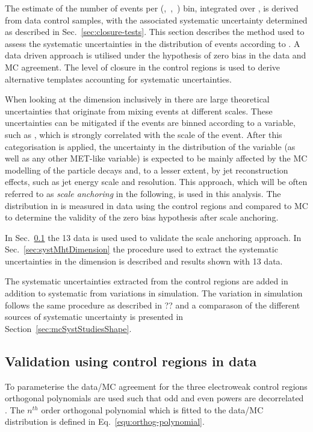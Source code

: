 The estimate of the number of events per (\njet,~\nb,~\scalht) bin,
integrated over \mht, is derived from data control samples, with
the associated systematic uncertainty determined as 
described in Sec.~\ref{sec:closure-tests}. This section
describes the method used to assess the systematic uncertainties in
the distribution of events according to \mht. A data driven approach is
utilised under the hypothesis of zero bias in the data and MC agreement.
The level of closure in the control regions is used
to derive alternative templates accounting for systematic uncertainties.

When looking at the \mht dimension inclusively in \scalht there are
large theoretical uncertainties that originate from mixing events
at different scales. These uncertainties can be mitigated if the events 
are binned according to a variable, such as \scalht, 
which is strongly correlated with the scale of the event. 
After this categorisation is applied, the uncertainty in 
the distribution of the \mht variable
(as well as any other MET-like variable) is expected to be 
mainly affected by the MC modelling of the particle 
decays and, to a lesser extent, by jet reconstruction effects, 
such as jet energy scale and resolution. 
This approach, which will be often referred to as \textit{scale anchoring}
in the following, is used in this analysis. The distribution in \mht
is measured in data using the control regions and compared to MC
to determine the validity of the zero bias hypothesis after scale anchoring.

In Sec.~\ref{sec:valid13} the 13 \TeV data is used used 
to validate the scale anchoring approach. 
In Sec.~\ref{sec:systMhtDimension} 
the procedure used to extract the systematic uncertainties in the 
\mht dimension is described and results shown with 13 \TeV data. 

The systematic uncertainties extracted from the control regions
are added in addition to systematic from variations in simulation.
The variation in simulation follows the same procedure as described in
?? and a comparason of the different sources of systematic uncertainty
is presented in Section~\ref{sec:mcSystStudiesShape}.

\subsection{Validation using control regions in data}
\label{sec:valid13}
To parameterise the data/MC agreement
for the three electroweak control regions
orthogonal polynomials are used such that odd and even powers 
are decorrelated \cite{cohen2013applied}. 
The $n^{th}$ order orthogonal polynomial which is fitted to the data/MC 
distribution is defined in Eq.~\ref{equ:orthog-polynomial}.

